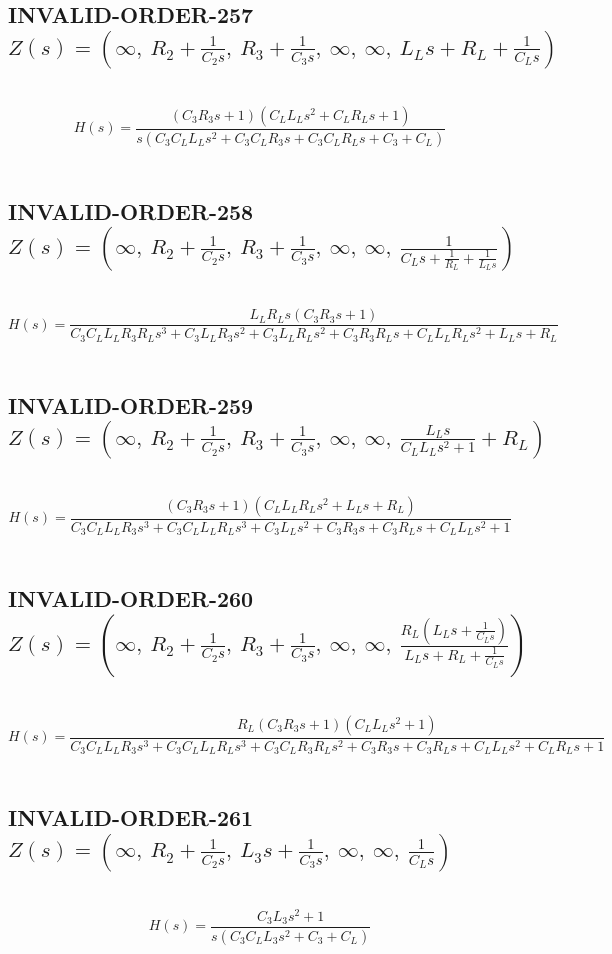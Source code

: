 \documentclass{article}
\begin{document}
\subsection{INVALID-ORDER-257 $Z(s) = \left( \infty, \  R_{2} + \frac{1}{C_{2} s}, \  R_{3} + \frac{1}{C_{3} s}, \  \infty, \  \infty, \  L_{L} s + R_{L} + \frac{1}{C_{L} s}\right)$ } \ 
\textbf{\[H(s) = \frac{\left(C_{3} R_{3} s + 1\right) \left(C_{L} L_{L} s^{2} + C_{L} R_{L} s + 1\right)}{s \left(C_{3} C_{L} L_{L} s^{2} + C_{3} C_{L} R_{3} s + C_{3} C_{L} R_{L} s + C_{3} + C_{L}\right)}\] } \ 
\subsection{INVALID-ORDER-258 $Z(s) = \left( \infty, \  R_{2} + \frac{1}{C_{2} s}, \  R_{3} + \frac{1}{C_{3} s}, \  \infty, \  \infty, \  \frac{1}{C_{L} s + \frac{1}{R_{L}} + \frac{1}{L_{L} s}}\right)$ } \ 
\textbf{\[H(s) = \frac{L_{L} R_{L} s \left(C_{3} R_{3} s + 1\right)}{C_{3} C_{L} L_{L} R_{3} R_{L} s^{3} + C_{3} L_{L} R_{3} s^{2} + C_{3} L_{L} R_{L} s^{2} + C_{3} R_{3} R_{L} s + C_{L} L_{L} R_{L} s^{2} + L_{L} s + R_{L}}\] } \ 
\subsection{INVALID-ORDER-259 $Z(s) = \left( \infty, \  R_{2} + \frac{1}{C_{2} s}, \  R_{3} + \frac{1}{C_{3} s}, \  \infty, \  \infty, \  \frac{L_{L} s}{C_{L} L_{L} s^{2} + 1} + R_{L}\right)$ } \ 
\textbf{\[H(s) = \frac{\left(C_{3} R_{3} s + 1\right) \left(C_{L} L_{L} R_{L} s^{2} + L_{L} s + R_{L}\right)}{C_{3} C_{L} L_{L} R_{3} s^{3} + C_{3} C_{L} L_{L} R_{L} s^{3} + C_{3} L_{L} s^{2} + C_{3} R_{3} s + C_{3} R_{L} s + C_{L} L_{L} s^{2} + 1}\] } \ 
\subsection{INVALID-ORDER-260 $Z(s) = \left( \infty, \  R_{2} + \frac{1}{C_{2} s}, \  R_{3} + \frac{1}{C_{3} s}, \  \infty, \  \infty, \  \frac{R_{L} \left(L_{L} s + \frac{1}{C_{L} s}\right)}{L_{L} s + R_{L} + \frac{1}{C_{L} s}}\right)$ } \ 
\textbf{\[H(s) = \frac{R_{L} \left(C_{3} R_{3} s + 1\right) \left(C_{L} L_{L} s^{2} + 1\right)}{C_{3} C_{L} L_{L} R_{3} s^{3} + C_{3} C_{L} L_{L} R_{L} s^{3} + C_{3} C_{L} R_{3} R_{L} s^{2} + C_{3} R_{3} s + C_{3} R_{L} s + C_{L} L_{L} s^{2} + C_{L} R_{L} s + 1}\] } \ 
\subsection{INVALID-ORDER-261 $Z(s) = \left( \infty, \  R_{2} + \frac{1}{C_{2} s}, \  L_{3} s + \frac{1}{C_{3} s}, \  \infty, \  \infty, \  \frac{1}{C_{L} s}\right)$ } \ 
\textbf{\[H(s) = \frac{C_{3} L_{3} s^{2} + 1}{s \left(C_{3} C_{L} L_{3} s^{2} + C_{3} + C_{L}\right)}\] } \ 
\end{document}
